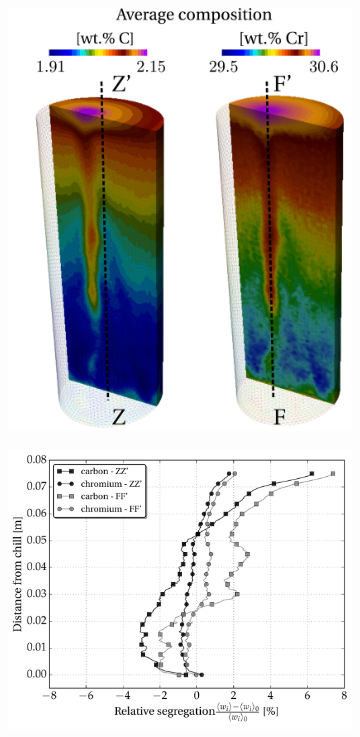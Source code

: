 \begin{figure}[htbp]
\centering
  \begin{subfigure}[t]{0.4\textwidth}
    \centering
	\includegraphics[width=1.0\textwidth]{Chapter4/Graphics/multicomponent/interior/final_interior_ZZ_FF.pdf}
	\caption{}
    \label{fig:final_interior_ZZ_FF}
  \end{subfigure}
	\hfill  
  \begin{subfigure}[t]{0.55\textwidth}
    \centering
	\includegraphics[width=1.0\textwidth]{Chapter4/Graphics/multicomponent/interior/final_segregation_ZZ_FF.pdf}

\end{subfigure}
\end{figure}
